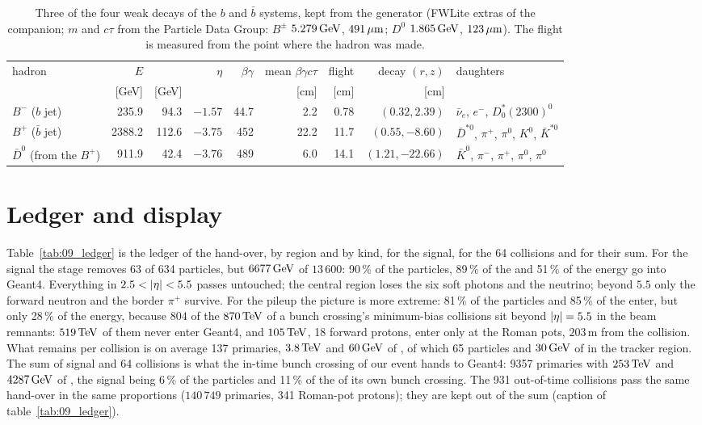 \begin{table}[!htb]
\centering\small\setlength{\tabcolsep}{4pt}
\caption{Three of the four weak decays of the $b$ and $\bar b$ systems, kept from the generator (FWLite extras of the
companion; $m$ and $c\tau$ from the Particle Data Group: $B^\pm$ $5.279\,\mathrm{GeV}$, $491\,\mu\mathrm{m}$; $D^0$ $1.865\,\mathrm{GeV}$,
$123\,\mu\mathrm{m}$). The flight is measured from the point where the hadron was made.}
\label{tab:09_decays}
\begin{tabular}{@{}l rrr r r rr l@{}}
\toprule
hadron & $E$ & \pt{} & $\eta$ & $\beta\gamma$ & mean $\beta\gamma c\tau$ & flight & decay $(r,z)$ & daughters \\
 & [GeV] & [GeV] & & & [cm] & [cm] & [cm] & \\
\midrule
$B^-$ ($b$ jet) & 235.9 & 94.3 & $-1.57$ & 44.7 & 2.2 & 0.78 & $(0.32, 2.39)$ & $\bar\nu_e$, $e^-$, $D_0^*(2300)^0$ \\
$B^+$ ($\bar b$ jet) & 2388.2 & 112.6 & $-3.75$ & 452 & 22.2 & 11.7 & $(0.55, -8.60)$ & $\bar D^{*0}$, $\pi^+$, $\pi^0$, $K^0$, $\bar K^{*0}$ \\
$\bar D^0$ (from the $B^+$) & 911.9 & 42.4 & $-3.76$ & 489 & 6.0 & 14.1 & $(1.21, -22.66)$ & $\bar K^0$, $\pi^-$, $\pi^+$, $\pi^0$, $\pi^0$ \\
\bottomrule
\end{tabular}
\end{table}

\section{Ledger and display}

Table~\ref{tab:09_ledger} is the ledger of the hand-over, by region and by kind, for the signal, for the 64
collisions and for their sum. For the signal the stage removes 63 of 634 particles, but $6677\,\mathrm{GeV}$ of
$13\,600$: 90\,\% of the particles, 89\,\% of the \pt{} and 51\,\% of the energy go into Geant4. Everything in
$2.5<\abseta<5.5$ passes untouched; the central region loses the six soft photons and the neutrino; beyond
$5.5$ only the forward neutron and the border $\pi^+$ survive. For the pileup the picture is more extreme:
81\,\% of the particles and 85\,\% of the \pt{} enter, but only 28\,\% of the energy, because $804$ of the
$870\,\mathrm{TeV}$ of a bunch crossing's minimum-bias collisions sit beyond $|\eta|=5.5$ in the beam remnants:
$519\,\mathrm{TeV}$ of them never enter Geant4, and $105\,\mathrm{TeV}$, 18 forward protons, enter only at the Roman pots, $203$\,m
from the collision. What remains per collision is on average 137 primaries, $3.8\,\mathrm{TeV}$
and $60\,\mathrm{GeV}$ of \pt{}, of which 65 particles and $30\,\mathrm{GeV}$ of \pt{} in the tracker region. The sum of signal and
64 collisions is what the in-time bunch crossing of our event hands to Geant4: 9357 primaries with $253\,\mathrm{TeV}$ and
$4287\,\mathrm{GeV}$ of \pt{}, the signal being 6\,\% of the particles and 11\,\% of the \pt{} of its own bunch crossing.
The 931 out-of-time collisions pass the same hand-over in the same proportions ($140\,749$ primaries, 341 Roman-pot
protons); they are kept out of the sum (caption of table~\ref{tab:09_ledger}).

